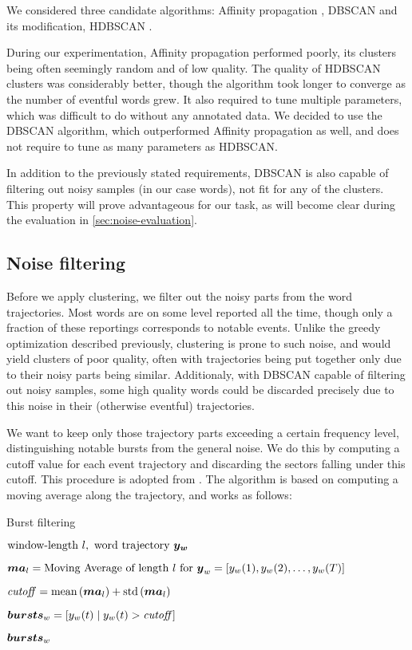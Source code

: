 We considered three candidate algorithms: Affinity propagation \citep{affinity-propagation}, DBSCAN \citep{dbscan} and its modification, HDBSCAN \citep{hdbscan}.

During our experimentation, Affinity propagation performed poorly, its clusters being often seemingly random and of low quality. The quality of HDBSCAN clusters was considerably better, though the algorithm took longer to converge as the number of eventful words grew. It also required to tune multiple parameters, which was difficult to do without any annotated data. We decided to use the DBSCAN algorithm, which outperformed Affinity propagation as well, and does not require to tune as many parameters as HDBSCAN.

In addition to the previously stated requirements, DBSCAN is also capable of filtering out noisy samples (in our case words), not fit for any of the clusters. This property will prove advantageous for our task, as will become clear during the evaluation in \autoref{sec:noise-evaluation}.


\subsection{Noise filtering}
Before we apply clustering, we filter out the noisy parts from the word trajectories. Most words are on some level reported all the time, though only a fraction of these reportings corresponds to notable events. Unlike the greedy optimization described previously, clustering is prone to such noise, and would yield clusters of poor quality, often with trajectories being put together only due to their noisy parts being similar. Additionaly, with DBSCAN capable of filtering out noisy samples, some high quality words could be discarded precisely due to this noise in their (otherwise eventful) trajectories.

We want to keep only those trajectory parts exceeding a certain frequency level, distinguishing notable bursts from the general noise. We do this by computing a cutoff value for each event trajectory and discarding the sectors falling under this cutoff. This procedure is adopted from \cite{online-search-queries}. The algorithm is based on computing a moving average along the trajectory, and works as follows:

\begin{algorithm}[H]
\begin{algorithmic}[1]
\caption{Burst filtering}
\label{alg:burst-filtering}
\Input $\text{window-length} \ l,\ \text{word trajectory} \ \vect{\traj_{w}}$

\State $\vect{MA}_{l} = \text{Moving Average of length} ~ l ~ \text{for} ~ \vect{\traj}_{w} = \left[ \traj_{w}(1), \traj_{w}(2), \dots, \traj_{w}(\streamlen) \right]$

\State $\mathit{cutoff} = \text{mean} \left( \vect{MA}_{l} \right) + \text{std} \left( \vect{MA}_{l} \right)$

\State $\vect{bursts}_{w} = \left[ \traj_{w}(t) \mid \traj_{w	}(t) > \mathit{cutoff} \right]$

\Output $\vect{bursts}_{w}$
\end{algorithmic}
\end{algorithm}


